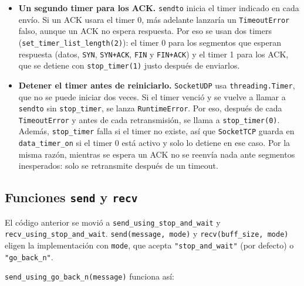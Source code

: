 \documentclass[11pt,letterpaper]{article}
\begin{document}
\begin{itemize}[nosep]
  \item \textbf{Un segundo timer para los ACK.} \texttt{sendto} inicia el timer indicado
        en cada envío. Si un ACK usara el timer 0, más adelante lanzaría un
        \texttt{TimeoutError} falso, aunque un ACK no espera respuesta. Por eso se usan
        dos timers (\texttt{set\_timer\_list\_length(2)}): el timer 0 para los segmentos
        que esperan respuesta (datos, \texttt{SYN}, \texttt{SYN+ACK}, \texttt{FIN} y
        \texttt{FIN+ACK}) y el timer 1 para los ACK, que se detiene con
        \texttt{stop\_timer(1)} justo después de enviarlos.
  \item \textbf{Detener el timer antes de reiniciarlo.} \texttt{SocketUDP} usa
        \texttt{threading.Timer}, que no se puede iniciar dos veces. Si el timer venció y
        se vuelve a llamar a \texttt{sendto} sin \texttt{stop\_timer}, se lanza
        \texttt{RuntimeError}. Por eso, después de cada \texttt{TimeoutError} y antes de
        cada retransmisión, se llama a \texttt{stop\_timer(0)}. Además, \texttt{stop\_timer}
        falla si el timer no existe, así que \texttt{SocketTCP} guarda en
        \texttt{data\_timer\_on} si el timer 0 está activo y solo lo detiene en ese caso.
        Por la misma razón, mientras se espera un ACK no se reenvía nada ante segmentos
        inesperados: solo se retransmite después de un timeout.
\end{itemize}

\subsection{Funciones \texttt{send} y \texttt{recv}}

El código anterior se movió a \texttt{send\_using\_stop\_and\_wait} y
\texttt{recv\_using\_stop\_and\_wait}. \texttt{send(message, mode)} y
\texttt{recv(buff\_size, mode)} eligen la implementación con \texttt{mode}, que acepta
\texttt{"stop\_and\_wait"} (por defecto) o \texttt{"go\_back\_n"}.

\texttt{send\_using\_go\_back\_n(message)} funciona así:
\end{document}
